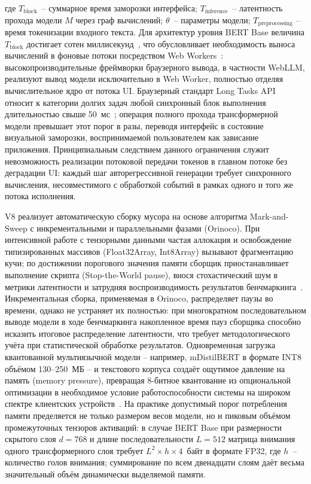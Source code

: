 \noindent где $T_{\text{block}}$~– суммарное время заморозки интерфейса; $T_{\text{inference}}$~– латентность прохода модели $M$ через граф вычислений; $\theta$~– параметры модели; $T_{\text{preprocessing}}$ – время токенизации входного текста. Для архитектур уровня BERT Base величина $T_{\text{block}}$ достигает сотен миллисекунд~\cite{wang2024anatomizing}, что обусловливает необходимость выноса вычислений в фоновые потоки посредством Web Workers~\cite{ruan2024webllm}: высокопроизводительные фреймворки браузерного вывода, в частности WebLLM, реализуют вывод модели исключительно в Web Worker, полностью отделяя вычислительное ядро от потока UI. Браузерный стандарт Long Tasks API относит к категории долгих задач любой синхронный блок выполнения длительностью свыше 50~мс~\cite{jia2024empowering}; операция полного прохода трансформерной модели превышает этот порог в разы, переводя интерфейс в состояние визуальной заморозки, воспринимаемой пользователем как зависание приложения. Принципиальным следствием данного ограничения служит невозможность реализации потоковой передачи токенов в главном потоке без деградации UI: каждый шаг авторегрессивной генерации требует синхронного вычисления, несовместимого с обработкой событий в рамках одного и того же потока исполнения.

V8 реализует автоматическую сборку мусора на основе алгоритма Mark-and-Sweep с инкрементальными и параллельными фазами (Orinoco). При интенсивной работе с тензорными данными частая аллокация и освобождение типизированных массивов (Float32Array, Int8Array) вызывают фрагментацию кучи; по достижении порогового значения памяти сборщик приостанавливает выполнение скрипта (Stop-the-World pause), внося стохастический шум в метрики латентности и затрудняя воспроизводимость результатов бенчмаркинга~\cite{jia2024empowering}. Инкрементальная сборка, применяемая в Orinoco, распределяет паузы во времени, однако не устраняет их полностью: при многократном последовательном выводе модели в ходе бенчмаркинга накопленное время пауз сборщика способно исказить итоговое распределение латентности, что требует методологического учёта при статистической обработке результатов. Одновременная загрузка квантованной мультиязычной модели – например, mDistilBERT в формате INT8 объёмом 130–250~МБ – и текстового корпуса создаёт ощутимое давление на память (memory pressure), превращая 8-битное квантование из опциональной оптимизации в необходимое условие работоспособности системы на широком спектре клиентских устройств~\cite{wang2024anatomizing}. На практике допустимый порог потребления памяти пределяется не только размером весов модели, но и пиковым объёмом промежуточных тензоров активаций: в случае BERT Base при размерности скрытого слоя $d=768$ и длине последовательности $L=512$ матрица внимания одного трансформерного слоя требует $L^2 \times h \times 4$~байт в формате FP32, где $h$~– количество голов внимания; суммирование по всем двенадцати слоям даёт весьма значительный объём динамически выделяемой памяти.

